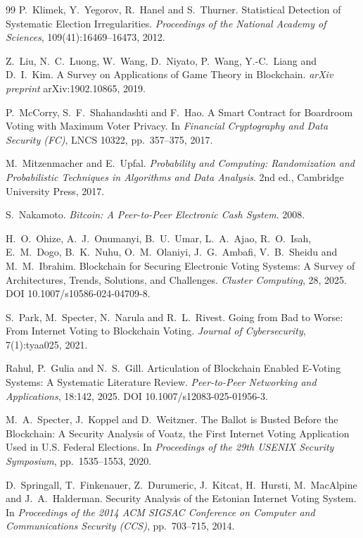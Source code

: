 \documentclass[11pt,a4paper]{article}
\begin{document}
\begin{thebibliography}{99}
 P.~Klimek, Y.~Yegorov, R.~Hanel and S.~Thurner.
Statistical Detection of Systematic Election Irregularities. \emph{Proceedings
of the National Academy of Sciences}, 109(41):16469--16473, 2012.

 Z.~Liu, N.~C.~Luong, W.~Wang, D.~Niyato, P.~Wang,
Y.-C.~Liang and D.~I.~Kim. A Survey on Applications of Game Theory in
Blockchain. \emph{arXiv preprint} arXiv:1902.10865, 2019.

 P.~McCorry, S.~F.~Shahandashti and F.~Hao. A Smart
Contract for Boardroom Voting with Maximum Voter Privacy. In \emph{Financial
Cryptography and Data Security (FC)}, LNCS 10322, pp.~357--375, 2017.

 M.~Mitzenmacher and E.~Upfal. \emph{Probability and
Computing: Randomization and Probabilistic Techniques in Algorithms and Data
Analysis}. 2nd ed., Cambridge University Press, 2017.

 S.~Nakamoto. \emph{Bitcoin: A Peer-to-Peer Electronic
Cash System}. 2008.

 H.~O.~Ohize, A.~J.~Onumanyi, B.~U.~Umar, L.~A.~Ajao,
R.~O.~Isah, E.~M.~Dogo, B.~K.~Nuhu, O.~M.~Olaniyi, J.~G.~Ambafi, V.~B.~Sheidu
and M.~M.~Ibrahim. Blockchain for Securing Electronic Voting Systems: A Survey
of Architectures, Trends, Solutions, and Challenges. \emph{Cluster Computing},
28, 2025. DOI 10.1007/s10586-024-04709-8.

 S.~Park, M.~Specter, N.~Narula and R.~L.~Rivest. Going from
Bad to Worse: From Internet Voting to Blockchain Voting. \emph{Journal of
Cybersecurity}, 7(1):tyaa025, 2021.

 Rahul, P.~Gulia and N.~S.~Gill. Articulation of Blockchain
Enabled E-Voting Systems: A Systematic Literature Review. \emph{Peer-to-Peer
Networking and Applications}, 18:142, 2025. DOI 10.1007/s12083-025-01956-3.

 M.~A.~Specter, J.~Koppel and D.~Weitzner. The Ballot is
Busted Before the Blockchain: A Security Analysis of Voatz, the First Internet
Voting Application Used in U.S. Federal Elections. In \emph{Proceedings of the
29th USENIX Security Symposium}, pp.~1535--1553, 2020.

 D.~Springall, T.~Finkenauer, Z.~Durumeric, J.~Kitcat,
H.~Hursti, M.~MacAlpine and J.~A.~Halderman. Security Analysis of the Estonian
Internet Voting System. In \emph{Proceedings of the 2014 ACM SIGSAC Conference
on Computer and Communications Security (CCS)}, pp.~703--715, 2014.

\end{thebibliography}
\end{document}
